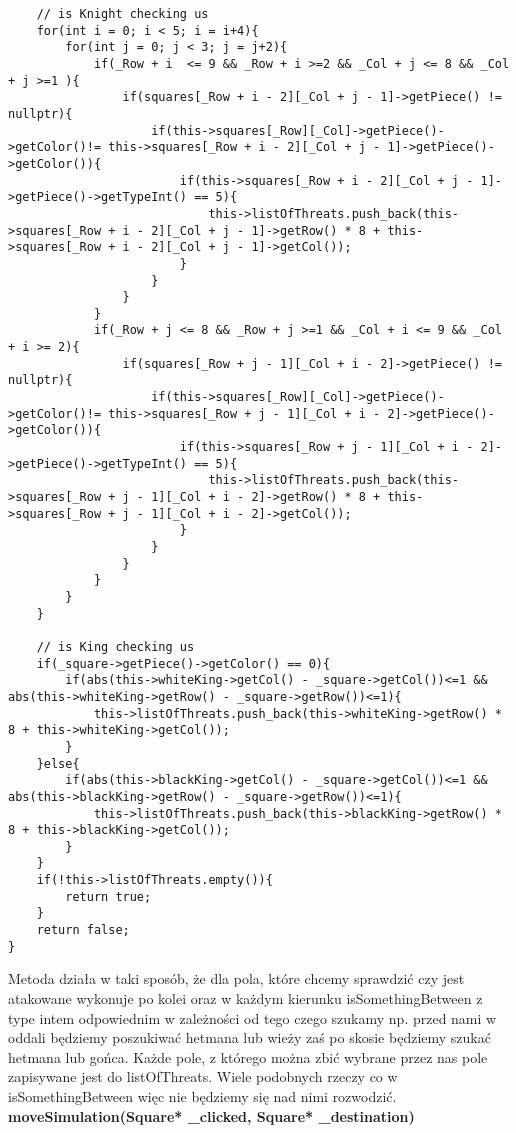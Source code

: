 \documentclass[]{report}
\begin{document}
\begin{flushleft}
\begin{lstlisting}
	// is Knight checking us
	for(int i = 0; i < 5; i = i+4){
		for(int j = 0; j < 3; j = j+2){
			if(_Row + i  <= 9 && _Row + i >=2 && _Col + j <= 8 && _Col + j >=1 ){
				if(squares[_Row + i - 2][_Col + j - 1]->getPiece() != nullptr){
					if(this->squares[_Row][_Col]->getPiece()->getColor()!= this->squares[_Row + i - 2][_Col + j - 1]->getPiece()->getColor()){
						if(this->squares[_Row + i - 2][_Col + j - 1]->getPiece()->getTypeInt() == 5){
							this->listOfThreats.push_back(this->squares[_Row + i - 2][_Col + j - 1]->getRow() * 8 + this->squares[_Row + i - 2][_Col + j - 1]->getCol());
						}
					}
				}
			}
			if(_Row + j <= 8 && _Row + j >=1 && _Col + i <= 9 && _Col + i >= 2){
				if(squares[_Row + j - 1][_Col + i - 2]->getPiece() != nullptr){
					if(this->squares[_Row][_Col]->getPiece()->getColor()!= this->squares[_Row + j - 1][_Col + i - 2]->getPiece()->getColor()){
						if(this->squares[_Row + j - 1][_Col + i - 2]->getPiece()->getTypeInt() == 5){
							this->listOfThreats.push_back(this->squares[_Row + j - 1][_Col + i - 2]->getRow() * 8 + this->squares[_Row + j - 1][_Col + i - 2]->getCol());
						}
					}
				}
			}
		}
	}
	
	// is King checking us
	if(_square->getPiece()->getColor() == 0){
		if(abs(this->whiteKing->getCol() - _square->getCol())<=1 && abs(this->whiteKing->getRow() - _square->getRow())<=1){
			this->listOfThreats.push_back(this->whiteKing->getRow() * 8 + this->whiteKing->getCol());
		}
	}else{
		if(abs(this->blackKing->getCol() - _square->getCol())<=1 && abs(this->blackKing->getRow() - _square->getRow())<=1){
			this->listOfThreats.push_back(this->blackKing->getRow() * 8 + this->blackKing->getCol());
		}
	}
	if(!this->listOfThreats.empty()){
		return true;
	}
	return false;
}
\end{lstlisting}
\vspace{\baselineskip}
Metoda działa w taki sposób, że dla pola, które chcemy sprawdzić czy jest atakowane wykonuje po kolei oraz w każdym kierunku isSomethingBetween z type intem odpowiednim w zależności od tego czego szukamy np. przed nami w oddali będziemy poszukiwać hetmana lub wieży zaś po skosie będziemy szukać hetmana lub gońca. Każde pole, z którego można zbić wybrane przez nas pole zapisywane jest do listOfThreats. Wiele podobnych rzeczy co w isSomethingBetween więc nie będziemy się nad nimi rozwodzić. 
\vspace{\baselineskip}
\newline
\textbf{moveSimulation(Square* \_clicked, Square* \_destination)}


\end{flushleft}
\end{document}
